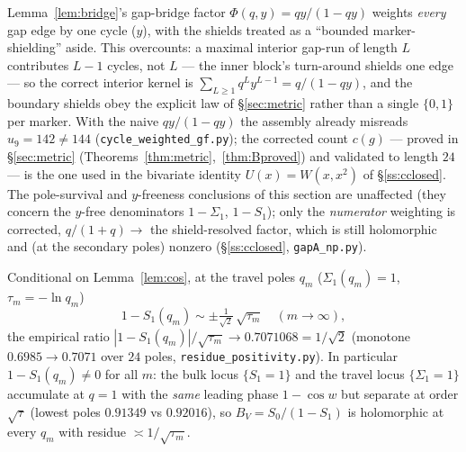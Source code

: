 \begin{remark}\label{rem:kernelfix}
Lemma~\ref{lem:bridge}'s gap-bridge factor $\Phi(q,y)=qy/(1-qy)$ weights \emph{every} gap edge by one
cycle ($y$), with the shields treated as a ``bounded marker-shielding'' aside. This overcounts: a
maximal interior gap-run of length $L$ contributes $L-1$ cycles, not $L$ — the inner block's
turn-around shields one edge — so the correct interior kernel is $\sum_{L\ge1}q^{L}y^{L-1}=q/(1-qy)$,
and the boundary shields obey the explicit law of \S\ref{sec:metric} rather than a single
$\{0,1\}$ per marker. With the naive $qy/(1-qy)$ the assembly already misreads $u_9=142\ne144$
(\texttt{cycle\_weighted\_gf.py}); the corrected count $c(g)$ — proved in
\S\ref{sec:metric} (Theorems~\ref{thm:metric},~\ref{thm:Bproved}) and validated to length $24$ — is
the one used in the bivariate identity $U(x)=W(x,x^{2})$ of \S\ref{ss:cclosed}. The pole-survival and
$y$-freeness conclusions of this section are unaffected (they concern the $y$-free denominators
$1-\Sigma_1$, $1-S_1$); only the \emph{numerator} weighting is corrected, $q/(1+q)\to$ the
shield-resolved factor, which is still holomorphic and (at the secondary poles) nonzero
(\S\ref{ss:cclosed}, \texttt{gapA\_np.py}).
\end{remark}

\begin{lemma}\label{lem:sqrttau}
Conditional on Lemma~\ref{lem:cos}, at the travel poles $q_m$ \textup($\Sigma_1(q_m)=1$,
$\tau_m=-\ln q_m$\textup)
\[
  1-S_1(q_m)\sim \pm\tfrac{1}{\sqrt2}\,\sqrt{\tau_m}\quad(m\to\infty),
\]
the empirical ratio $|1-S_1(q_m)|/\sqrt{\tau_m}\to0.7071068=1/\sqrt2$ \textup(monotone
$0.6985\to0.7071$ over $24$ poles, \texttt{residue\_positivity.py}\textup). In
particular $1-S_1(q_m)\ne0$ for all $m$: the bulk locus $\{S_1=1\}$ and the travel
locus $\{\Sigma_1=1\}$ accumulate at $q=1$ with the \emph{same} leading phase
$1-\cos w$ but separate at order $\sqrt\tau$ \textup(lowest poles $0.91349$ vs
$0.92016$\textup), so $B_V=S_0/(1-S_1)$ is holomorphic at every $q_m$ with residue
$\asymp1/\sqrt{\tau_m}$.
\end{lemma}

